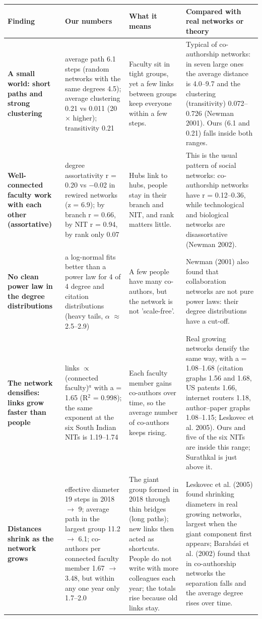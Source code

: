 \begin{tabular}{@{}p{2.5cm}p{4.4cm}p{4.5cm}p{5.4cm}@{}}
\toprule
Finding & Our numbers & What it means & Compared with real networks or theory \\
\midrule
\textbf{A small world: short paths and strong clustering} & average path 6.1 steps (random networks with the same degrees 4.5); average clustering 0.21 vs 0.011 (20$\times$ higher); transitivity 0.21 & Faculty sit in tight groups, yet a few links between groups keep everyone within a few steps. & Typical of co-authorship networks: in seven large ones the average distance is 4.0--9.7 and the clustering (transitivity) 0.072--0.726 (Newman 2001). Ours (6.1 and 0.21) falls inside both ranges. \\
\addlinespace[1.5pt]
\textbf{Well-connected faculty work with each other (assortative)} & degree assortativity r = 0.20 vs $-$0.02 in rewired networks (z = 6.9); by branch r = 0.66, by NIT r = 0.94, by rank only 0.07 & Hubs link to hubs, people stay in their branch and NIT, and rank matters little. & This is the usual pattern of social networks: co-authorship networks have r = 0.12--0.36, while technological and biological networks are disassortative (Newman 2002). \\
\addlinespace[1.5pt]
\textbf{No clean power law in the degree distributions} & a log-normal fits better than a power law for 4 of 4 degree and citation distributions (heavy tails, $\alpha$ $\approx$ 2.5--2.9) & A few people have many co-authors, but the network is not 'scale-free'. & Newman (2001) also found that collaboration networks are not pure power laws: their degree distributions have a cut-off. \\
\addlinespace[1.5pt]
\textbf{The network densifies: links grow faster than people} & links $\propto$ (connected faculty)$^{a}$ with a = 1.65 (R$^2$ = 0.998); the same exponent at the six South Indian NITs is 1.19--1.74 & Each faculty member gains co-authors over time, so the average number of co-authors keeps rising. & Real growing networks densify the same way, with a = 1.08--1.68 (citation graphs 1.56 and 1.68, US patents 1.66, internet routers 1.18, author--paper graphs 1.08--1.15; Leskovec et al. 2005). Ours and five of the six NITs are inside this range; Surathkal is just above it. \\
\addlinespace[1.5pt]
\textbf{Distances shrink as the network grows} & effective diameter 19 steps in 2018 $\to$ 9; average path in the largest group 11.2 $\to$ 6.1; co-authors per connected faculty member 1.67 $\to$ 3.48, but within any one year only 1.7--2.0 & The giant group formed in 2018 through thin bridges (long paths); new links then acted as shortcuts. People do not write with more colleagues each year; the totals rise because old links stay. & Leskovec et al. (2005) found shrinking diameters in real growing networks, largest when the giant component first appears; Barab\'asi et al. (2002) found that in co-authorship networks the separation falls and the average degree rises over time. \\

\end{tabular}
